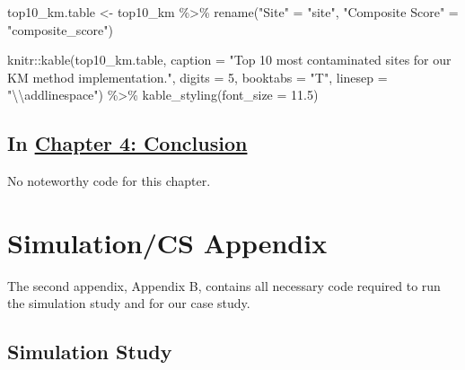 \documentclass[12pt, twoside]{amherstthesis}
\newenvironment{Shaded}{\begin{snugshade}}{\end{snugshade}}
\newcommand{\AttributeTok}[1]{\textcolor[rgb]{0.77,0.63,0.00}{#1}}
\newcommand{\DecValTok}[1]{\textcolor[rgb]{0.00,0.00,0.81}{#1}}
\newcommand{\FloatTok}[1]{\textcolor[rgb]{0.00,0.00,0.81}{#1}}
\newcommand{\FunctionTok}[1]{\textcolor[rgb]{0.00,0.00,0.00}{#1}}
\newcommand{\NormalTok}[1]{#1}
\newcommand{\OtherTok}[1]{\textcolor[rgb]{0.56,0.35,0.01}{#1}}
\newcommand{\SpecialCharTok}[1]{\textcolor[rgb]{0.00,0.00,0.00}{#1}}
\newcommand{\StringTok}[1]{\textcolor[rgb]{0.31,0.60,0.02}{#1}}
\begin{document}
\begin{Shaded}
\begin{Highlighting}[]
\NormalTok{top10\_km.table }\OtherTok{\textless{}{-}}\NormalTok{ top10\_km }\SpecialCharTok{\%\textgreater{}\%}
  \FunctionTok{rename}\NormalTok{(}\StringTok{"Site"} \OtherTok{=} \StringTok{"site"}\NormalTok{, }
         \StringTok{"Composite Score"} \OtherTok{=} \StringTok{"composite\_score"}\NormalTok{)}

\NormalTok{knitr}\SpecialCharTok{::}\FunctionTok{kable}\NormalTok{(top10\_km.table, }\AttributeTok{caption =} \StringTok{"Top 10 most contaminated sites }
\StringTok{             for our KM method implementation."}\NormalTok{, }
             \AttributeTok{digits =} \DecValTok{5}\NormalTok{, }\AttributeTok{booktabs =} \StringTok{"T"}\NormalTok{, }\AttributeTok{linesep =} \StringTok{"}\SpecialCharTok{\textbackslash{}\textbackslash{}}\StringTok{addlinespace"}\NormalTok{) }\SpecialCharTok{\%\textgreater{}\%}
  \FunctionTok{kable\_styling}\NormalTok{(}\AttributeTok{font\_size =} \FloatTok{11.5}\NormalTok{) }
\end{Highlighting}
\end{Shaded}
\hypertarget{in-chapter-4-conclusion}{%
\section{\texorpdfstring{In \protect\hyperlink{conclusion}{Chapter 4: Conclusion}}{In Chapter 4: Conclusion}}\label{in-chapter-4-conclusion}}

No noteworthy code for this chapter.

\hypertarget{simulationcs-appendix}{%
\chapter{Simulation/CS Appendix}\label{simulationcs-appendix}}

The second appendix, Appendix B, contains all necessary code required to run the simulation study and for our case study.

\hypertarget{simulation-study}{%
\section{Simulation Study}\label{simulation-study}}
\end{document}
